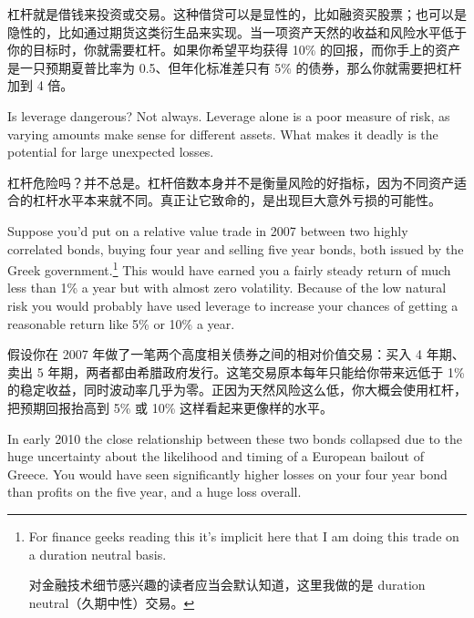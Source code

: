 \begin{chineseblock}杠杆就是借钱来投资或交易。这种借贷可以是显性的，比如融资买股票；也可以是隐性的，比如通过期货这类衍生品来实现。当一项资产天然的收益和风险水平低于你的目标时，你就需要杠杆。如果你希望平均获得 10\% 的回报，而你手上的资产是一只预期夏普比率为 0.5、但年化标准差只有 5\% 的债券，那么你就需要把杠杆加到 4 倍。\end{chineseblock}

\bipairgap

\begin{englishblock} Is leverage dangerous? Not always. Leverage alone is a poor measure of risk, as varying amounts make sense for different assets. What makes it deadly is the potential for large unexpected losses. \end{englishblock}

\begin{chineseblock}杠杆危险吗？并不总是。杠杆倍数本身并不是衡量风险的好指标，因为不同资产适合的杠杆水平本来就不同。真正让它致命的，是出现巨大意外亏损的可能性。\end{chineseblock}

\bipairgap

\begin{englishblock} Suppose you'd put on a relative value trade in 2007 between two highly correlated bonds, buying four year and selling five year bonds, both issued by the Greek government.\footnote{For finance geeks reading this it's implicit here that I am doing this trade on a duration neutral basis. \par 对金融技术细节感兴趣的读者应当会默认知道，这里我做的是 duration neutral（久期中性）交易。} This would have earned you a fairly steady return of much less than 1\% a year but with almost zero volatility. Because of the low natural risk you would probably have used leverage to increase your chances of getting a reasonable return like 5\% or 10\% a year. \end{englishblock}

\begin{chineseblock}假设你在 2007 年做了一笔两个高度相关债券之间的相对价值交易：买入 4 年期、卖出 5 年期，两者都由希腊政府发行。这笔交易原本每年只能给你带来远低于 1\% 的稳定收益，同时波动率几乎为零。正因为天然风险这么低，你大概会使用杠杆，把预期回报抬高到 5\% 或 10\% 这样看起来更像样的水平。\end{chineseblock}

\bipairgap

\begin{englishblock} In early 2010 the close relationship between these two bonds collapsed due to the huge uncertainty about the likelihood and timing of a European bailout of Greece. You would have seen significantly higher losses on your four year bond than profits on the five year, and a huge loss overall. \end{englishblock}

